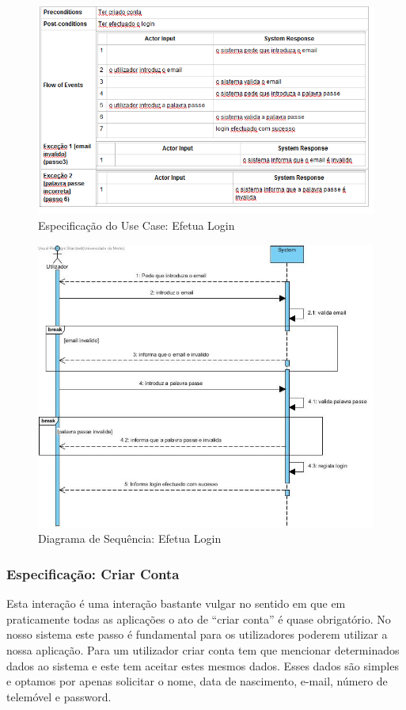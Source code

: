 \begin{figure}[htb!]
	\centering
	\includegraphics[scale=0.6]{imagens/Especificacoes/efetualogin}  
	\caption{Especificação do Use Case: Efetua Login  }  
\end{figure}


\begin{figure}[htb!]
	\centering
	\includegraphics[scale=0.5]{imagens/diagramaSeq/Login}  
	\caption{Diagrama de Sequência: Efetua Login }  
\end{figure}



\newpage \clearpage

\subsubsection{Especificação: Criar Conta }
Esta interação é uma interação bastante vulgar no sentido em que em praticamente todas as aplicações o ato de “criar conta” é quase obrigatório.  No nosso sistema este passo é fundamental para os utilizadores poderem utilizar a nossa aplicação. Para um utilizador criar conta tem que mencionar determinados dados ao sistema e este tem aceitar estes mesmos dados. Esses dados são simples e optamos por apenas solicitar o nome, data de nascimento, e-mail, número de telemóvel e password.

